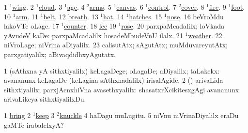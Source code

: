 \noindent
\gl{\pagu}
\expl{}
\bmng
{} 
\bnum
\num{1}  \hyperref{kandict_w.pdf}{W}{wing(1) pagu(8)}{$^1$wing}. 
\num{2}  \hyperref{kandict_c.pdf}{C}{cloud(1) nuga(2)}{$^1$cloud}. 
\num{3}  \hyperref{kandict_a.pdf}{A}{age(1) pagu(5)}{$^1$age}. 
\num{4}  \hyperref{kandict_a.pdf}{A}{arm(2) nuga(4)}{$^2$arms}. 
\num{5}  \hyperref{kandict_c.pdf}{C}{convas(1) pagu(1)}{$^1$canvas}. 
\num{6}  \hyperref{kandict_c.pdf}{C}{control(1) pagu(3)}{$^1$control}. 
\num{7} \hyperref{kandict_c.pdf}{C}{cover(2) pagu(3)}{$^2$cover}. 
\num{8}  \hyperref{kandict_f.pdf}{F}{fire(1) pagu(9)}{$^1$fire}. 
\num{9}  \hyperref{kandict_f.pdf}{F}{foot(1) nuga(37)}{$^1$foot}. 
\num{10}  \hyperref{kandict_a.pdf}{A}{arm(1) pagu(2)}{$^1$arm}. 
\num{11}  \hyperref{kandict_b.pdf}{B}{belt(1) nuga(4)}{$^1$belt}. 
\num{12}  \hyperref{kandict_b.pdf}{B}{breathpagu(13)}{breath}. 
\num{13}  \hyperref{kandict_h.pdf}{H}{hat(1) nuga(15)}{$^1$hat}. 
\num{14}  \hyperref{kandict_h.pdf}{H}{hatch(1) pagu(2)}{$^1$hatches}. 
\num{15} \hyperref{kandict_n.pdf}{N}{nose(1) pagu(29)}{$^1$nose}. 
\num{16}  beVroMdu lakoVTe oLage. 
\num{17} \hyperref{kandict_c.pdf}{C}{counter(1) nuga(2)}{$^1$counter}. 
\num{18}  \hyperref{kandict_l.pdf}{L}{lee pagu}{lee}  
\num{19} \hyperref{kandict_r.pdf}{R}{rose(1) pagu(13)}{$^1$rose}. 
\num{20}  parxpaMcadalilx; loVkada yAvudeV kaDe:  parxpaMcadalilx hosadeMbudeVnU ilalx. 
\num{21}  \hyperref{kandict_w.pdf}{W}{weather(1) pagu(7)}{$^1$weather}. 
\num{22}  niVroLage; niVrina aDiyalilx. 
\num{23}  calisutAtx; sAgutAtx; muMduvareyutAtx; parxgatiyalilx; aBivaqdidhxyAgutatx. 
\enum
\emng
\eentry

\bentry
{} 
\gl{\kirxvi}
\expl{}
\bmng
\bnum
\num{1} (sAthxna yA sithxtiyalilx) keLagaDege; oLagaDe; aDiyalilx; taLakekx:  avananunx keLagaDe (keLagina sAthxnadalilx) irisalAgide. 
\num{2} (\AmA) arivaLida sithxtiyalilx; parxjAcnxhiVna avasethxyalilx:  shasatxrXcikitesxgAgi avananunx arivaLikeya sithxtiyalilxDu. 
\enum
\emng

\noindent
\gl{\pagu}
\expl{}
\bmng
\bnum
\num{1} \hyperref{kandict_b.pdf}{B}{bring nuga(26)}{bring}  
\num{2} \hyperref{kandict_k.pdf}{K}{keep(1) nuga(37)}{$^1$keep}  
\num{3} \hyperref{kandict_k.pdf}{K}{knuckle(2) pagu(1)}{$^2$knuckle}  
\num{4}  haDagu muLugitu. 
\num{5}  niVnu niVrinaDiyalilx eraDu gaMTe irabalelxyA? 
\enum
\emng
\eentry

